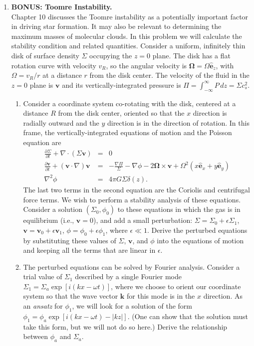 \documentclass[twoside]{tufte-book} %
\newcommand{\veco}{{\mathbf{\Omega}}}
\newcommand{\vecv}{\mathbf{v}}
\newcommand{\ehat}{\hat{\mathbf{e}}}
\begin{document}
\begin{enumerate}
\item \textbf{BONUS: Toomre Instability.}\\
Chapter 10 discusses the Toomre instability as a potentially important factor in driving star formation. It may also be relevant to determining the maximum masses of molecular clouds. In this problem we will calculate the stability condition and related quantities. Consider a uniform, infinitely thin disk of surface density $\Sigma$ occupying the $z=0$ plane. The disk has a flat rotation curve with velocity $v_R$, so the angular velocity is $\veco=\Omega \ehat_z$, with $\Omega = v_R/r$ at a distance $r$ from the disk center. The velocity of the fluid in the $z=0$ plane is $\vecv$ and its vertically-integrated pressure is $\Pi=\int_{-\infty}^{\infty} P \, dz = \Sigma c_s^2$. 
\begin{enumerate}
\item Consider a coordinate system co-rotating with the disk, centered at a distance $R$ from the disk center, oriented so that the $x$ direction is radially outward and the $y$ direction is in the direction of rotation. In this frame, the vertically-integrated equations of motion and the Poisson equation are
\begin{eqnarray*}
\frac{\partial \Sigma}{\partial t} + \nabla \cdot (\Sigma \vecv) & = & 0 \\
\frac{\partial \vecv}{\partial t} + (\vecv\cdot\nabla)\vecv & = & -\frac{\nabla \Pi}{\Sigma} - \nabla \phi - 2\veco \times \vecv + \Omega^2 (x \ehat_x + y \ehat_y) \\
\nabla^2 \phi & = & 4 \pi G \Sigma \delta(z).
\end{eqnarray*}
The last two terms in the second equation are the Coriolis and centrifugal force terms.
We wish to perform a stability analysis of these equations. Consider a solution $(\Sigma_0, \phi_0)$ to these equations in which the gas is in equilibrium (i.e., $\vecv=0$), and add a small perturbation: $\Sigma=\Sigma_0 + \epsilon \Sigma_1$, $\vecv = \vecv_0 + \epsilon \vecv_1$, $\phi=\phi_0 + \epsilon \phi_1$, where $\epsilon \ll 1$. Derive the perturbed equations by substituting these values of $\Sigma$, $\vecv$, and $\phi$ into the equations of motion and keeping all the terms that are linear in $\epsilon$.
\item The perturbed equations can be solved by Fourier analysis. Consider a trial value of $\Sigma_1$ described by a single Fourier mode $\Sigma_1 = \Sigma_a \exp[i(kx - \omega t)]$, where we choose to orient our coordinate system so that the wave vector $\mathbf{k}$ for this mode is in the $x$ direction. As an {\it ansatz} for $\phi_1$, we will look for a solution of the form $\phi_1 = \phi_a \exp[i(kx - \omega t) - |k z|]$. (One can show that the solution must take this form, but we will not do so here.) Derive the relationship between $\phi_a$ and $\Sigma_a$.

\end{enumerate}
\end{enumerate}
\end{document}
